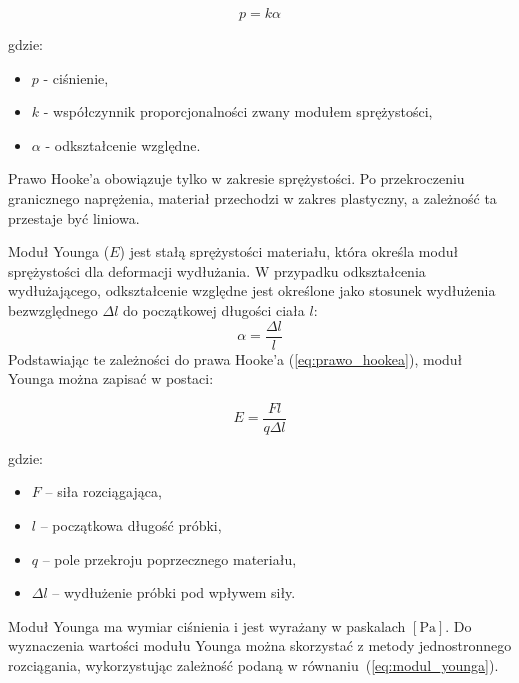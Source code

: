 \documentclass[a4paper,12pt]{article}
\begin{document}
\begin{equation} \label{eq:prawo_hookea}
p = k\alpha
\end{equation}

gdzie:
\begin{itemize}
    \setlength{\itemsep}{0em}
    \item $p$ - ciśnienie,
    \item $k$ - współczynnik proporcjonalności zwany modułem sprężystości,
    \item $\alpha$ - odkształcenie względne.
\end{itemize}

Prawo Hooke’a obowiązuje tylko w zakresie sprężystości. Po przekroczeniu granicznego naprężenia, materiał przechodzi w zakres plastyczny, a zależność ta przestaje być liniowa.



 

Moduł Younga ($E$) jest stałą sprężystości materiału, która określa moduł sprężystości dla deformacji wydłużania. W przypadku odkształcenia wydłużającego, odkształcenie względne jest określone jako stosunek wydłużenia bezwzględnego $\Delta{l}$ do początkowej długości ciała $l$:
$$
\alpha = \frac{\Delta l}{l}
$$
Podstawiając te zależności do prawa Hooke’a (\ref{eq:prawo_hookea}), moduł Younga można zapisać w postaci:

\begin{equation} \label{eq:modul_younga}
E = \frac{Fl}{q \Delta l}
\end{equation}

gdzie:
\begin{itemize}
    \setlength{\itemsep}{0em}
    \item $F$ – siła rozciągająca,
    \item $l$ – początkowa długość próbki,
    \item $q$ – pole przekroju poprzecznego materiału,
    \item $\Delta l$ – wydłużenie próbki pod wpływem siły.
\end{itemize}
Moduł Younga ma wymiar ciśnienia i jest wyrażany w paskalach $[\text{Pa}]$.
Do wyznaczenia wartości modułu Younga można skorzystać z metody jednostronnego rozciągania, wykorzystując zależność podaną w równaniu~(\ref{eq:modul_younga}).
\end{document}
